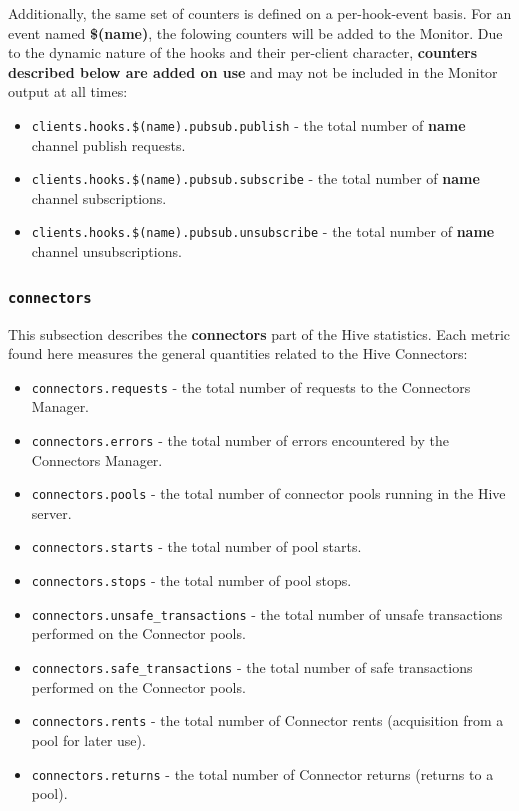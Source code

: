 \documentclass[a4paper]{article}
\begin{document}
\begin{itemize}
\noindent
Additionally, the same set of counters is defined on a per-hook-event basis. For an event named \textbf{\$(name)}, the folowing counters will be added to the Monitor. Due to the dynamic nature of the hooks and their per-client character, \textbf{counters described below are added on use} and may not be included in the Monitor output at all times:


\begin{itemize}
\item \texttt{clients.hooks.\$(name).pubsub.publish} - the total number of \textbf{name} channel publish requests.
\item \texttt{clients.hooks.\$(name).pubsub.subscribe} - the total number of \textbf{name} channel subscriptions.
\item \texttt{clients.hooks.\$(name).pubsub.unsubscribe} - the total number of \textbf{name} channel unsubscriptions.
\end{itemize}

\end{itemize} %
\subsubsection{\texttt{connectors}}
\label{sec-4-2-10}

This subsection describes the \textbf{connectors} part of the Hive statistics. Each metric found here measures the general quantities related to the Hive Connectors:


\begin{itemize}
\item \texttt{connectors.requests} - the total number of requests to the Connectors Manager.
\item \texttt{connectors.errors} - the total number of errors encountered by the Connectors Manager.
\item \texttt{connectors.pools} - the total number of connector pools running in the Hive server.
\item \texttt{connectors.starts} - the total number of pool starts.
\item \texttt{connectors.stops} - the total number of pool stops.
\item \texttt{connectors.unsafe\_transactions} - the total number of unsafe transactions performed on the Connector pools.
\item \texttt{connectors.safe\_transactions} - the total number of safe transactions performed on the Connector pools.
\item \texttt{connectors.rents} - the total number of Connector rents (acquisition from a pool for later use).
\item \texttt{connectors.returns} - the total number of Connector returns (returns to a pool).
\end{itemize}
\end{document}
